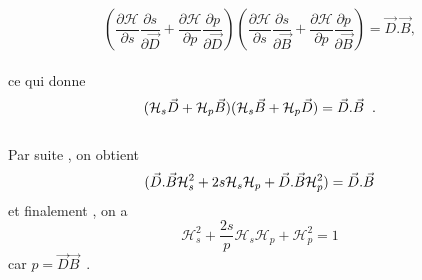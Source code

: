 \documentclass[12pt,a4paper, openany]{article}
\begin{document}
 	 \begin{equation*}
 	 \left(\frac{\partial{\mathcal{H}}}{\partial{\textit{s}}}\frac{\partial{\textit{s}}}{\partial{\vec{D}}}+\frac{\partial{\mathcal{H}}}{\partial{p}}\frac{\partial{p}}{\partial{\vec{D}}}\right)\left(\frac{\partial{\mathcal{H}}}{\partial{\textit{s}}}\frac{\partial{\textit{s}}}{\partial{\vec{B}}}+\frac{\partial{\mathcal{H}}}{\partial{p}}\frac{\partial{p}}{\partial{\vec{B}}}\right)= \vec{D}.\vec{B} , 
 	  \end{equation*}
 	  \\
 	  ce qui donne
 	 \begin{equation*} 
 	 (\mathcal{H}_s\vec{D}+\mathcal{H}_p\vec{B})(\mathcal{H}_s\vec{B}+\mathcal{H}_p\vec{D})=\vec{D}.\vec{B}\hspace{0.2cm} .  
     \end{equation*}
     \\
     Par suite , on obtient 
 \begin{equation*}  
 	 (\vec{D}.\vec{B}\mathcal{H}^{2}_s+2s\mathcal{H}_s\mathcal{H}_p+\vec{D}.\vec{B}\mathcal{H}^{2}_p)=\vec{D}.\vec{B} \\
 	\end{equation*}
  et finalement , on a 
  \begin{equation}
  	\mathcal{H}^{2}_s+\frac{2s}{p}\mathcal{H}_s\mathcal{H}_p+\mathcal{H}^{2}_p =1 
  \end{equation}
  car $p=\vec{D}\vec{B}$ \,.\\
 
\end{document}

